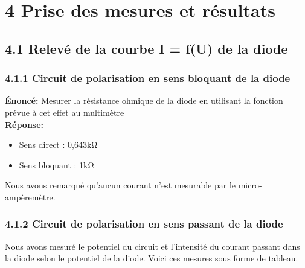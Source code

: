 \documentclass{report}
\begin{document}
\section*{4 Prise des mesures et résultats}


\subsection*{4.1 Relevé de la courbe I = f(U) de la diode}

\subsubsection*{4.1.1 Circuit de polarisation en sens bloquant de la diode}

\textbf{\'Enonc\'e:} Mesurer la résistance ohmique de la diode en utilisant la fonction prévue à cet effet au multimètre \\

\textbf{R\'eponse:}
\begin{itemize}
\item Sens direct : 0,643k$\si{\ohm}$
\item Sens bloquant : 1k$\si{\ohm}$ 
\end{itemize}

Nous avons remarqué qu'aucun courant n'est mesurable par le micro-ampèremètre.

\subsubsection*{4.1.2 Circuit de polarisation en sens passant de la diode}

Nous avons mesuré le potentiel du circuit et l'intensité du courant passant dans la diode selon le potentiel de la diode. Voici ces mesures sous forme de tableau.\\
\end{document}
